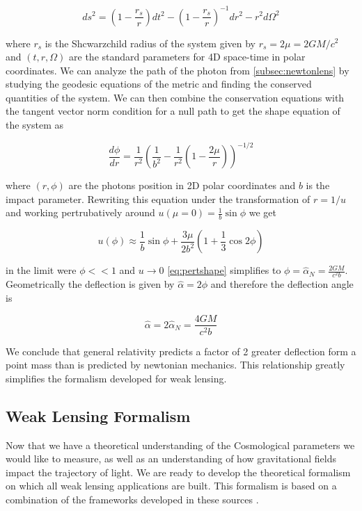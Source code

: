 \begin{equation}
  ds^2 = \left ( 1-\frac{r_s}{r} \right )  dt^2 - \left( 1-\frac{r_s}{r}\right) ^{-1} dr^2 -r^2 d\Omega^2
  \label{schwarz}
\end{equation}

where $r_s$ is the Shcwarzchild radius of the system given by $r_s=2 \mu = 2GM/c^2$ and $(t,r,\Omega)$ are the standard parameters for 4D space-time in polar coordinates. We can analyze the path of the photon from \autoref{subsec:newtonlens} by studying the geodesic equations of the metric and finding the conserved
quantities of the system. We can then combine the conservation equations with the tangent vector norm condition for a 
null path to get the shape equation of the system as 

\begin{equation}
  \frac{d\phi}{dr} = \frac{1}{r^2} \left(\frac{1}{b^2}- \frac{1}{r^2} \left(1-\frac{2\mu}{r}\right) \right)^{-1/2}
  \label{shapeeqbend}
\end{equation}

where $(r,\phi)$ are the photons position in 2D polar coordinates and $b$ is the impact parameter. Rewriting this equation
under the transformation of $r = 1/u$ and working pertrubatively around $u(\mu =0) = \frac{1}{b}\sin \phi
$ we get 

\begin{equation}
  u(\phi) \approx \frac{1}{b}\sin \phi + \frac{3\mu}{2b^2} \left(1+\frac{1}{3}\cos 2 \phi \right)
  \label{eq:pertshape}
\end{equation}

in the limit were $\phi << 1$ and $u \rightarrow 0$ \autoref{eq:pertshape} simplifies to $\phi = \hat{\alpha}_N =\frac{2GM}{c^2b} $. Geometrically the deflection is given by $\hat{\alpha}= 2\phi$ and therefore the deflection angle is

\begin{equation}
  \hat{\alpha} = 2\hat{\alpha}_N=\frac{4GM}{c^2b}
  \label{grbend}
\end{equation}

We conclude that general relativity predicts a factor of 2 greater deflection form a point mass than is predicted by newtonian mechanics. This relationship greatly simplifies the formalism developed for weak lensing. 

\subsection{Weak Lensing Formalism}
Now that we have a theoretical understanding of the Cosmological parameters we would like to measure, as well as an understanding of how gravitational fields impact the trajectory of light. We are ready to develop the theoretical formalism on which all weak lensing applications are built. This formalism is based on a combination of the frameworks developed in these sources \cite{basicLens,general_2013,rachel_2018,hoekstra,massey_2013,Mellier:1998pk,Hoekstra:2013gua}.

